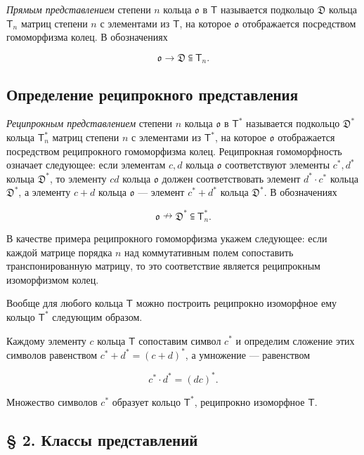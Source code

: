 \documentclass[11pt]{article}
\begin{document}
\emph{Прямым представлением} степени \(n\) кольца \(\mathfrak{o}\) в \(\mathsf T\) называется подкольцо \(\mathfrak D\) кольца \(\mathsf T_n\) матриц степени \(n\) с элементами из \(\mathsf T\), на которое \(\mathfrak{o}\) отображается посредством гомоморфизма колец. В обозначениях

\[
\mathfrak{o}\to\mathfrak D\subseteqq\mathsf T_n.
\]

\subsection*{Определение реципрокного представления}\label{definition-der-reziproken-darstellung}

\emph{Реципрокным представлением} степени \(n\) кольца \(\mathfrak{o}\) в \(\mathsf T^*\) называется подкольцо \(\mathfrak D^*\) кольца \(\mathsf T_n^*\) матриц степени \(n\) с элементами из \(\mathsf T^*\), на которое \(\mathfrak{o}\) отображается посредством реципрокного гомоморфизма колец. Реципрокная гомоморфность означает следующее: если элементам \(c,d\) кольца \(\mathfrak{o}\) соответствуют элементы \(c^*,d^*\) кольца \(\mathfrak D^*\), то элементу \(cd\) кольца \(\mathfrak{o}\) должен соответствовать элемент \(d^*\cdot c^*\) кольца \(\mathfrak D^*\), а элементу \(c+d\) кольца \(\mathfrak{o}\) --- элемент \(c^*+d^*\) кольца \(\mathfrak D^*\). В обозначениях

\[
\mathfrak{o}\nrightarrow\mathfrak D^*\subseteqq\mathsf T_n^*.
\]

В качестве примера реципрокного гомоморфизма укажем следующее: если каждой матрице порядка \(n\) над коммутативным полем сопоставить транспонированную матрицу, то это соответствие является реципрокным изоморфизмом колец.

Вообще для любого кольца \(\mathsf T\) можно построить реципрокно изоморфное ему кольцо \(\mathsf T^*\) следующим образом.

Каждому элементу \(c\) кольца \(\mathsf T\) сопоставим символ \(c^*\) и определим сложение этих символов равенством \(c^*+d^*=(c+d)^*\), а умножение --- равенством

\[
c^*\cdot d^*=(dc)^*.
\]

Множество символов \(c^*\) образует кольцо \(\mathsf T^*\), реципрокно изоморфное \(\mathsf T\).

\subsection*{§ 2. Классы представлений}\label{darstellungsklassen}
\end{document}
